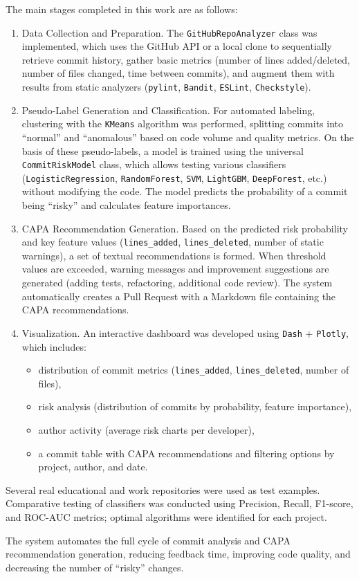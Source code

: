 {	The main stages completed in this work are as follows:
	\begin{enumerate}
		\item Data Collection and Preparation. The \texttt{GitHubRepoAnalyzer} class was implemented, which uses the GitHub API or a local clone to sequentially retrieve commit history, gather basic metrics (number of lines added/deleted, number of files changed, time between commits), and augment them with results from static analyzers (\texttt{pylint}, \texttt{Bandit}, \texttt{ESLint}, \texttt{Checkstyle}).
		\item Pseudo-Label Generation and Classification. For automated labeling, clustering with the \texttt{KMeans} algorithm was performed, splitting commits into “normal” and “anomalous” based on code volume and quality metrics. On the basis of these pseudo-labels, a model is trained using the universal \texttt{CommitRiskModel} class, which allows testing various classifiers (\texttt{LogisticRegression}, \texttt{RandomForest}, \texttt{SVM}, \texttt{LightGBM}, \texttt{DeepForest}, etc.) without modifying the code. The model predicts the probability of a commit being “risky” and calculates feature importances.
		\item CAPA Recommendation Generation. Based on the predicted risk probability and key feature values (\texttt{lines\_added}, \texttt{lines\_deleted}, number of static warnings), a set of textual recommendations is formed. When threshold values are exceeded, warning messages and improvement suggestions are generated (adding tests, refactoring, additional code review). The system automatically creates a Pull Request with a Markdown file containing the CAPA recommendations.
		\item Visualization. An interactive dashboard was developed using \texttt{Dash} + \texttt{Plotly}, which includes:
		\begin{itemize}
			\item distribution of commit metrics (\texttt{lines\_added}, \texttt{lines\_deleted}, number of files),
			\item risk analysis (distribution of commits by probability, feature importance),
			\item author activity (average risk charts per developer),
			\item a commit table with CAPA recommendations and filtering options by project, author, and date.
		\end{itemize}
	\end{enumerate}
	
	Several real educational and work repositories were used as test examples. Comparative testing of classifiers was conducted using Precision, Recall, F1-score, and ROC-AUC metrics; optimal algorithms were identified for each project.
	
	The system automates the full cycle of commit analysis and CAPA recommendation generation, reducing feedback time, improving code quality, and decreasing the number of “risky” changes.
} %


